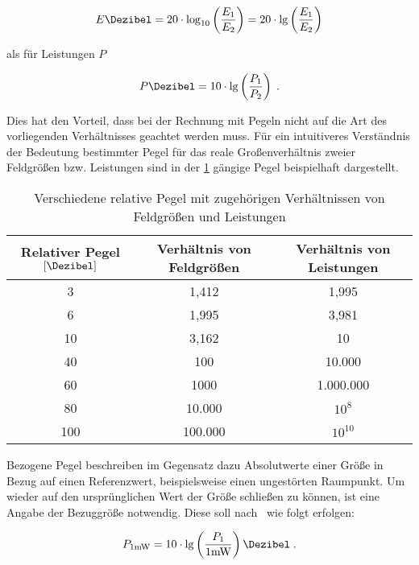 \begin{equation}
    E \si{\Dezibel} = 20 \cdot \log_{10} \left( \frac{E_1}{E_2} \right) = 20 \cdot \lg \left( \frac{E_1}{E_2} \right)
\end{equation}

als für Leistungen $P$

\begin{equation}
    P \si{\Dezibel} = 10 \cdot \lg \left( \frac{P_1}{P_2} \right) \; .
\end{equation}

Dies hat den Vorteil, dass bei der Rechnung mit Pegeln nicht auf die Art des vorliegenden Verhältnisses geachtet werden muss. Für ein intuitiveres Verständnis der Bedeutung bestimmter Pegel für das reale Großenverhältnis zweier Feldgrößen bzw. Leistungen sind in der \Tabelle\ref{tab:2_Relative_Pegel} gängige Pegel beispielhaft dargestellt.

\begin{table}
\centering
\caption{Verschiedene relative Pegel mit zugehörigen Verhältnissen von Feldgrößen und Leistungen}
\begin{tabular}{c c c}
    \toprule
    Relativer Pegel $\left[\si{\Dezibel}\right]$ & Verhältnis von Feldgrößen & Verhältnis von Leistungen \\
    \midrule
    3   &   1,412   &   1,995   \\
    6   &   1,995   &   3,981   \\
    10  &   3,162   &   10      \\
    40  &   100     &   10.000  \\
    60  &   1000    &   1.000.000 \\
    80  &   10.000  &   $10^8$  \\
    100 &   100.000  &   $10^{10}$ \\
    \bottomrule
\end{tabular}
\label{tab:2_Relative_Pegel}
\end{table}

Bezogene Pegel beschreiben im Gegensatz dazu Absolutwerte einer Größe in Bezug auf einen Referenzwert, beispielsweise einen ungestörten Raumpunkt. Um wieder auf den ursprünglichen Wert der Größe schließen zu können, ist eine Angabe der Bezuggröße notwendig. Diese soll nach~\cite{IEC60027-3} wie folgt erfolgen: 

\begin{equation}
    P_{1 \si{\milli\watt}} = 10 \cdot \lg \left( \frac{P_1}{1 \si{\milli\watt}}\right) \si{\Dezibel} \; .
\end{equation}

